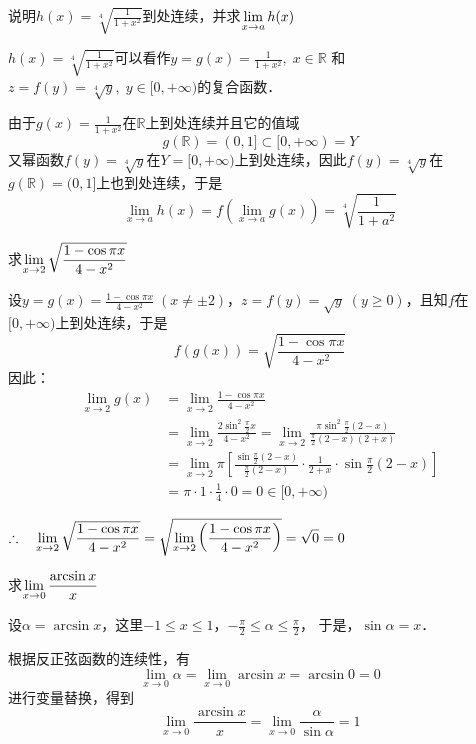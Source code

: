 \begin{example}
    说明$h(x)=\sqrt[4]{\frac{1}{1+x^2}}$到处连续，并求$\displaystyle\lim_{x\to a}h(x)$
\end{example}

\begin{solution}
    $h(x)=\sqrt[4]{\frac{1}{1+x^2}}$可以看作$y=g(x)=\frac{1}{1+x^2},\; x\in\mathbb{R}$
和$z=f(y)=\sqrt[4]{y},\; y\in [0,+\infty)$的复合函数．

由于$g(x)=\frac{1}{1+x^2}$在$\mathbb{R}$上到处连续并且它的值域
\[g(\mathbb{R})=(0,1]\subset [0,+\infty)=Y\]
又幂函数$f(y)=\sqrt[4]{y}$在$Y=[0,+\infty)$上到处连续，因此$f(y)=\sqrt[4]{y}$在$g(\mathbb{R})=(0,1]$上也到处连续，于是
\[\lim_{x\to a}h(x)=f\left(\lim_{x\to a}g(x)\right)=\sqrt[4]{\frac{1}{1+a^2}}\]
\end{solution}


\begin{example}
    求$\displaystyle\lim_{x\to 2}\sqrt{\dfrac{1-\cos\pi x}{4-x^2}}$
\end{example}

\begin{solution}
设$y=g(x)=\frac{1-\cos\pi x}{4-x^2}\; (x\ne \pm 2)$，$z=f(y)=\sqrt{y}\; (y\ge 0)$，且知$f$在$[0,+\infty)$上到处连续，于是
\[f(g(x))=\sqrt{\frac{1-\cos\pi x}{4-x^2}}\]
因此：
\[\begin{split}
    \lim_{x\to 2}g(x)&=\lim_{x\to 2}\frac{1-\cos \pi x}{4-x^2}\\
    &=\lim_{x\to 2}\frac{2\sin^2\frac{\pi}{2}x}{4-x^2}=\lim_{x\to 2}\frac{\pi\sin^2\frac{\pi}{2}(2-x)}{\frac{\pi}{2}(2-x)(2+x)}\\
    &=\lim_{x\to 2}\pi\left[\frac{\sin\frac{\pi}{2}(2-x)}{\frac{\pi}{2}(2-x)}\cdot \frac{1}{2+x}\cdot \sin\frac{\pi}{2}(2-x)  \right]\\
    &=\pi\cdot 1\cdot \frac{1}{4}\cdot 0=0\in [0,+\infty)
\end{split}\]

$\therefore\quad \displaystyle\lim_{x\to 2}\sqrt{\dfrac{1-\cos\pi x}{4-x^2}}=\sqrt{\displaystyle\lim_{x\to 2}\left(\dfrac{1-\cos\pi x}{4-x^2}\right)}=\sqrt{0}=0$
\end{solution}

\begin{example}
    求$\displaystyle\lim_{x\to 0}\dfrac{\arcsin x}{x}$
\end{example}

\begin{solution}
设$\alpha=\arcsin x$，这里$-1\le x\le 1$，$-\frac{\pi}{2}\le\alpha\le \frac{\pi}{2}$，
于是，$\sin\alpha=x$．

根据反正弦函数的连续性，有
\[\lim_{x\to 0} \alpha=\lim_{x\to 0}\arcsin x=\arcsin 0=0\]
进行变量替换，得到
\[\lim_{x\to 0} \frac{\arcsin x}{x}=\lim_{x\to 0}\frac{\alpha}{\sin\alpha}=1\]
\end{solution}

